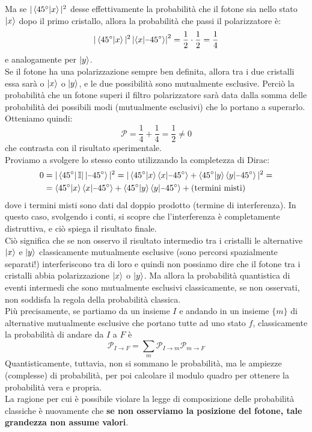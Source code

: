 \documentclass[FisicaTeorica.tex]{subfiles}
\begin{document}
Ma se $|\braket{45^\circ |x}|^2$ desse effettivamente la probabilità che il fotone sia nello stato $\ket{x}$ dopo il primo cristallo, allora la probabilità che passi il polarizzatore è:
\[
|\braket{45^\circ |x}|^2 \left |\braket{x|\minus 45^\circ}\right |^2 = \frac{1}{2}\cdot \frac{1}{2} = \frac{1}{4}
\] %
e analogamente per $\ket{y}$.\\
Se il fotone ha una polarizzazione sempre ben definita, allora tra i due cristalli essa sarà o $\ket{x}$ o $\ket{y}$, e le due possibilità sono mutualmente esclusive.
Perciò la probabilità che un fotone superi il filtro polarizzatore sarà data dalla somma delle probabilità dei possibili modi (mutualmente esclusivi) che lo portano a superarlo. Otteniamo quindi:
\[
\mathcal{P} = \frac{1}{4} + \frac{1}{4} = \frac{1}{2} \neq 0
\]
che contrasta con il risultato sperimentale.\\
Proviamo a svolgere lo stesso conto utilizzando la completezza di Dirac:
\begin{align*}
0 &= |\bra{45^\circ} \bb{I}|\ket{\minus 45^\circ}|^2 = |\braket{45^\circ|x}\braket{x|\minus 45^\circ} + \braket{45^\circ|y}\braket{y|\minus 45^\circ}|^2 =\\
&= \braket{45^\circ|x}\braket{x|\minus 45^\circ} + \braket{45^\circ|y}\braket{y|\minus 45^\circ} + \text{(termini misti)}
\end{align*}
dove i termini misti sono dati dal doppio prodotto (termine di interferenza). In questo caso, svolgendo i conti, si scopre che l'interferenza è completamente distruttiva, e ciò spiega il risultato finale.\\
Ciò significa che se non osservo il risultato intermedio tra i cristalli le alternative $\ket{x}$ e $\ket{y}$ classicamente mutualmente esclusive (sono percorsi spazialmente separati!) interferiscono tra di loro e quindi non possiamo dire che il fotone tra i cristalli abbia polarizzazione $\ket{x}$ o $\ket{y}$. Ma allora la probabilità quantistica di eventi intermedi che sono mutualmente esclusivi classicamente, se non osservati, non soddisfa la regola della probabilità classica.\\
Più precisamente, se partiamo da un insieme $I$ e andando in un insieme $\{m\}$ di alternative mutualmente esclusive che portano tutte ad uno stato $f$, classicamente la probabilità di andare da $I$ a $F$ è \[
\mathcal{P}_{I\to F} = \sum_m \mathcal{P}_{I\to m}\mathcal{P}_{m\to F}
\]
Quantisticamente, tuttavia, non si sommano le probabilità, ma le ampiezze (complesse) di probabilità, per poi calcolare il modulo quadro per ottenere la probabilità vera e propria.\\ 
La ragione per cui è possibile violare la legge di composizione delle probabilità classiche è nuovamente che \textbf{se non osserviamo la posizione del fotone, tale grandezza non assume valori}. 
\end{document}
